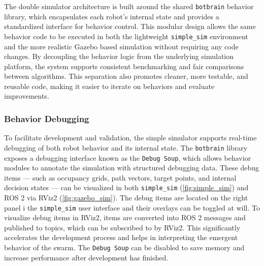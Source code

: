 The double simulator architecture is built around the shared \texttt{botbrain} behavior library, which encapsulates each robot’s internal state and provides a standardized interface for behavior control. This modular design allows the same behavior code to be executed in both the lightweight \texttt{simple\_sim} environment and the more realistic Gazebo based simulation without requiring any code changes. By decoupling the behavior logic from the underlying simulation platform, the system supports consistent benchmarking and fair comparisons between algorithms. This separation also promotes cleaner, more testable, and reusable code, making it easier to iterate on behaviors and evaluate improvements.

\subsubsection{Behavior Debugging}
To facilitate development and validation, the simple simulator supports real-time debugging of both robot behavior and its internal state. The \texttt{botbrain} library exposes a debugging interface known as the \texttt{Debug Soup}, which allows behavior modules to annotate the simulation with structured debugging data. These debug items --- such as occupancy grids, path vectors, target points, and internal decision states --- can be visualized in both \texttt{simple\_sim} (\cref{fig:simple_sim}) and ROS 2 via RViz2 (\cref{fig:gazebo_sim}). The debug items are located on the right panel i the \texttt{simple\_sim} user interface and their overlays can be toggled at will. To visualize debug items in RViz2, items are converted into ROS 2 messages and published to topics, which can be subscribed to by RViz2. This significantly accelerates the development process and helps in interpreting the emergent behavior of the swarm. The \texttt{Debug Soup} can be disabled to save memory and increase performance after development has finished.

